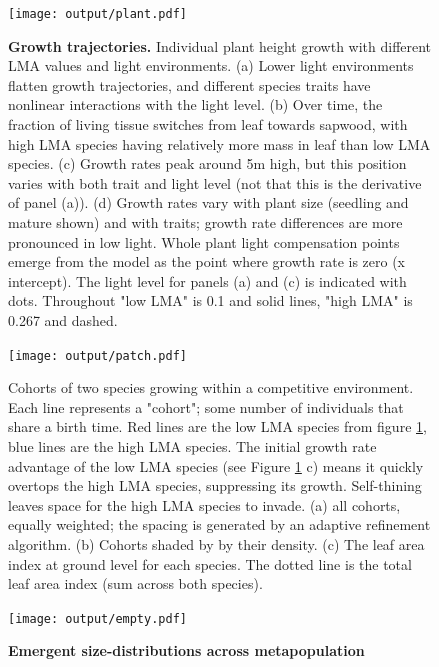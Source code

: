 \documentclass[]{article}
\begin{document}
\newpage

\begin{figure}[h!]
\centering
\texttt{[image: output/plant.pdf]}
\caption{\textbf{Growth trajectories.} Individual plant height growth with different LMA values and light environments.  (a) Lower light environments flatten growth trajectories, and different species traits have nonlinear interactions with the light level.  (b) Over time, the fraction of living tissue switches from leaf towards sapwood, with high LMA species having relatively more mass in leaf than low LMA species.  (c) Growth rates peak around 5m high, but this position varies with both trait and light level (not that this is the derivative of panel (a)).  (d) Growth rates vary with plant size (seedling and mature shown) and with traits; growth rate differences are more pronounced in low light.  Whole plant light compensation points emerge from the model as the point where growth rate is zero (x intercept).  The light level for panels (a) and (c) is indicated with dots.  Throughout "low LMA" is 0.1 and solid lines, "high LMA" is 0.267 and dashed.
\label{fig:plant}}
\end{figure}

\newpage

\begin{figure}[h!]
\centering
\texttt{[image: output/patch.pdf]}
\caption{Cohorts of two species growing within a competitive environment.  Each line represents a "cohort"; some number of individuals that share a birth time.  Red lines are the low LMA species from figure \ref{fig:plant}, blue lines are the high LMA species.  The initial growth rate advantage of the low LMA species (see Figure \ref{fig:plant} c) means it quickly overtops the high LMA species, suppressing its growth.  Self-thining leaves space for the high LMA species to invade.  (a) all cohorts, equally weighted; the spacing is generated by an adaptive refinement algorithm.  (b) Cohorts shaded by by their density.  (c) The leaf area index at ground level for each species.  The dotted line is the total leaf area index (sum across both species).}
\label{fig:patch}
\end{figure}

\newpage

\begin{figure}[h!]
\centering
\texttt{[image: output/empty.pdf]}
\caption{\textbf{Emergent size-distributions across metapopulation}
\label{fig:emergent}}
\end{figure}

\newpage
\end{document}
